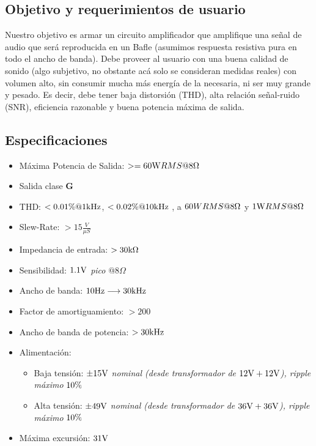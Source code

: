 \subsection{Objetivo y requerimientos de usuario}

Nuestro objetivo es armar un circuito amplificador que amplifique una señal de audio que será reproducida en un Bafle (asumimos respuesta resistiva pura en todo el ancho de banda).  Debe proveer al usuario con una buena calidad de sonido (algo subjetivo, no obstante acá solo se consideran medidas reales) con volumen alto, sin consumir mucha más energía de la necesaria, ni ser muy grande y pesado. Es decir, debe tener baja distorsión (THD), alta relación señal-ruido (SNR), eficiencia razonable y buena potencia máxima de salida.



\subsection{Especificaciones}

\bigskip

\begin{itemize}
	\item Máxima Potencia de Salida:  $>= 60\si[per-mode=symbol]{\watt} RMS @8\si[per-mode=symbol]{\ohm}$
	\item Salida clase \textbf{G}
	\item THD: $< 0.01 \si[per-mode=symbol]{\percent} @ 1\si[per-mode=symbol]{\kilo\hertz}$, $<0.02 \si[per-mode=symbol]{\percent} @ 10\si[per-mode=symbol]{\kilo\hertz}$ , a $60W RMS@8\si[per-mode=symbol]{\ohm}$ y $1\si[per-mode=symbol]{\watt} RMS @8 \si[per-mode=symbol]{\ohm}$
	\item Slew-Rate: $>15\frac{V}{\mu S}$
	\item Impedancia de entrada: $>30\si[per-mode=symbol]{\kilo\ohm}$
	\item Sensibilidad: $1.1\si[per-mode=symbol]{\volt}$ \textit{pico} $@8\Omega$
	\item Ancho de banda: $10\si[per-mode=symbol]{\hertz} \longrightarrow  30\si[per-mode=symbol]{\kilo\hertz}$
	\item Factor de amortiguamiento: $>200$
	\item Ancho de banda de potencia: $>30\si[per-mode=symbol]{\kilo\hertz}$
	\item Alimentación: 
	\begin{itemize}
		\item Baja tensión: $ \pm 15\si[per-mode=symbol]{\volt}$ \textit{nominal (desde transformador de $ 12 \si[per-mode=symbol]{\volt} +12 \si[per-mode=symbol]{\volt}$), ripple máximo} $10 \si[per-mode=symbol]{\percent}$
		\item Alta tensión: $ \pm 49\si[per-mode=symbol]{\volt}$ \textit{nominal (desde transformador de $ 36 \si[per-mode=symbol]{\volt} +36 \si[per-mode=symbol]{\volt}$), ripple máximo} $10 \si[per-mode=symbol]{\percent}$
	\end{itemize}
	
	\item Máxima excursión: $31\si[per-mode=symbol]{\volt}$
\end{itemize}



